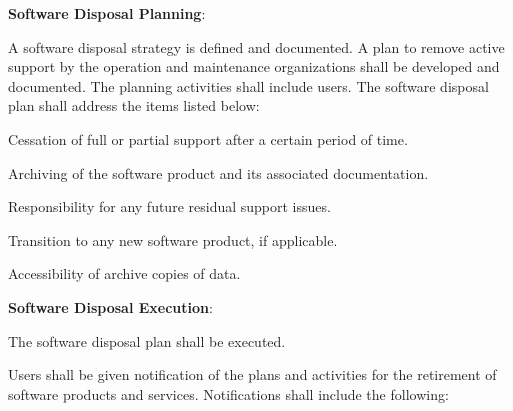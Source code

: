			\begin{adjustwidth}{2em}{0pt} 

				\begin{compactenum}

					\item {\bf Software Disposal Planning}:

					\begin{compactenum}

						\item A software disposal strategy is defined and documented. A plan to remove active support by the operation and maintenance organizations shall be developed and documented. The planning activities shall include users. The software disposal plan shall address the items listed below:

						\begin{compactenum}

							\item Cessation of full or partial support after a certain period of time.

							\item Archiving of the software product and its associated documentation.

							\item Responsibility for any future residual support issues.

							\item Transition to any new software product, if applicable.

							\item Accessibility of archive copies of data.

						\end{compactenum}

					\end{compactenum}

					\item {\bf Software Disposal Execution}:

					\begin{compactenum}

						\item The software disposal plan shall be executed.

						\item Users shall be given notification of the plans and activities for the retirement of software products and services. Notifications shall include the following:

						\begin{compactenum}


\end{compactenum}
\end{compactenum}
\end{compactenum}
\end{adjustwidth}
